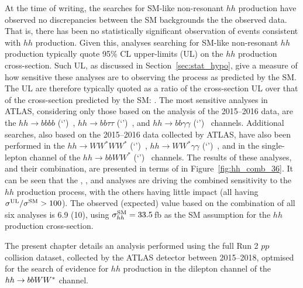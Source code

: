 At the time of writing, the searches for SM-like non-resonant $hh$ production have observed no discrepancies
between the SM backgrounds the the observed data.
That is, there has been no statistically significant observation of events consistent with $hh$ production.
Given this, analyses searching for SM-like non-resonant $hh$ production typically quote 95\% CL
upper-limits (UL) on the $hh$ production cross-section.
Such UL, as discussed in Section~\ref{sec:stat_hypo}, give a measure of how sensitive these analyses
are to observing the process as predicted by the SM.
The UL are therefore typically quoted as a ratio of the cross-section UL over that of the cross-section
predicted by the SM: \sigmaRatio.
The most sensitive analyses in ATLAS, considering only those based on the analysis of the 2015--2016 data,
are the $hh \rightarrow bbbb$ (`\bbbb')~\cite{HHBBBB}, $hh \rightarrow bb\tau\tau$ (`\bbtautau')~\cite{HHBBTAUTAU},
and $hh \rightarrow bb\gamma\gamma$ (`\bbyy')~\cite{HHBBGAMGAM} channels.
Additional searches, also based on the 2015--2016 data collected by ATLAS, have also been performed
in the $hh \rightarrow WW^*WW^*$ (`\wwww')~\cite{HHWWWW}, $hh \rightarrow WW^* \gamma \gamma$ (`\wwyy')~\cite{HHWWGAMGAM},
and in the single-lepton channel of the $hh \rightarrow bbWW^*$ (`\bbww')~\cite{HHBBWW} channels.
The results of these analyses, and their combination, are presented in terms of \sigmaRatio in Figure~\ref{fig:hh_comb_36}.
It can be seen that the \bbtautau, \bbbb, and \bbyy analyses are driving the combined sensitivity
to the $hh$ production process, with the others having little impact (all having $\sigma^{\text{UL}} / \sigma^{\text{SM}} >100$).
The observed (expected) \sigmaRatio value based on the combination of all six analyses is 6.9 (10), using
$\sigma_{hh}^{\text{SM}} = 33.5$\,fb as the SM assumption for the $hh$ production cross-section.

The present chapter details an analysis performed using the full Run 2 $pp$ collision dataset, collected
by the ATLAS detector between 2015--2018, optmised for the search of evidence for $hh$ production
in the dilepton channel of the $hh \rightarrow bbWW^*$ channel.

